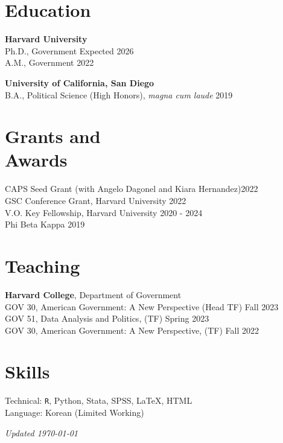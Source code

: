 \documentclass[margin, line]{res}
\begin{document}
\begin{resume}
\section{Education}
\textbf{Harvard University}\\
\hspace*{5mm} Ph.D., Government \hfill Expected 2026\\
\hspace*{5mm} A.M., Government \hfill 2022

\textbf{University of California, San Diego}\\
\hspace*{5mm} B.A., Political Science (High Honors), \textit{magna cum laude} \hfill 2019

\section{Grants and \\Awards}
CAPS Seed Grant (with Angelo Dagonel and Kiara Hernandez)\hfill 2022\\
GSC Conference Grant, Harvard University \hfill 2022\\
V.O. Key Fellowship, Harvard University \hfill 2020 - 2024\\
Phi Beta Kappa \hfill 2019

\section{Teaching}
\textbf{Harvard College}, Department of Government\\
\hspace*{5mm} GOV 30, American Government: A New Perspective (Head TF) \hfill Fall 2023\\
\hspace*{5mm} GOV 51, Data Analysis and Politics, (TF) \hfill Spring 2023\\
\hspace*{5mm} GOV 30, American Government: A New Perspective,  (TF) \hfill Fall 2022

\section{Skills}
Technical: \texttt{R}, Python, Stata, SPSS, \LaTeX, HTML\\
Language: Korean (Limited Working)

\vspace*{\fill}

\hfill \small{\textit{Updated \today}}

\end{resume}
\end{document}
